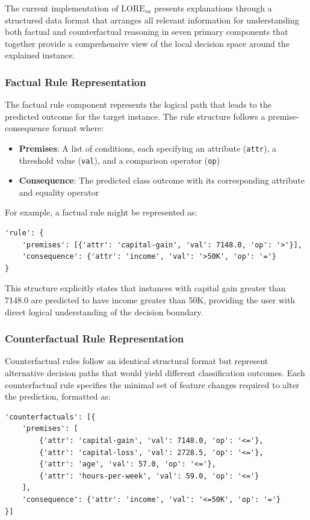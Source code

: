 The current implementation of $\text{LORE}_{sa}$ presents explanations through a structured data format that arranges all relevant information for understanding both factual and counterfactual reasoning in seven primary components that together provide a comprehensive view of the local decision space around the explained instance.

\subsubsection{Factual Rule Representation}

The factual rule component represents the logical path that leads to the predicted outcome for the target instance. The rule structure follows a premise-consequence format where:

\begin{itemize}
    \item \textbf{Premises}: A list of conditions, each specifying an attribute (\texttt{attr}), a threshold value (\texttt{val}), and a comparison operator (\texttt{op})
    \item \textbf{Consequence}: The predicted class outcome with its corresponding attribute and equality operator
\end{itemize}

For example, a factual rule might be represented as:
\begin{verbatim}
'rule': {
    'premises': [{'attr': 'capital-gain', 'val': 7148.0, 'op': '>'}],
    'consequence': {'attr': 'income', 'val': '>50K', 'op': '='}
}
\end{verbatim}

This structure explicitly states that instances with capital gain greater than 7148.0 are predicted to have income greater than 50K, providing the user with direct logical understanding of the decision boundary.

\subsubsection{Counterfactual Rule Representation}

Counterfactual rules follow an identical structural format but represent alternative decision paths that would yield different classification outcomes. Each counterfactual rule specifies the minimal set of feature changes required to alter the prediction, formatted as:

\begin{verbatim}
'counterfactuals': [{
    'premises': [
        {'attr': 'capital-gain', 'val': 7148.0, 'op': '<='},
        {'attr': 'capital-loss', 'val': 2728.5, 'op': '<='},
        {'attr': 'age', 'val': 57.0, 'op': '<='},
        {'attr': 'hours-per-week', 'val': 59.0, 'op': '<='}
    ],
    'consequence': {'attr': 'income', 'val': '<=50K', 'op': '='}
}]
\end{verbatim}

